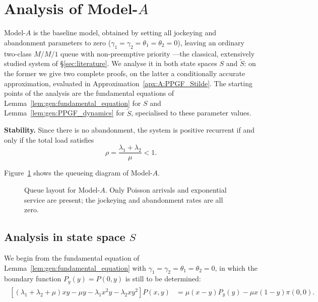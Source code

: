 \section{Analysis of Model-\texorpdfstring{$A$}{A}}\label{sec:model_a}

Model-$A$ is the baseline model, obtained by setting all jockeying and abandonment
parameters to zero ($\gamma_1=\gamma_2=\theta_1=\theta_2=0$), leaving an ordinary
two-class $M/M/1$ queue with non-preemptive priority ---the classical, extensively
studied system of \S\ref{sec:literature}. We analyse it in both state spaces $S$ and
$\widetilde{S}$: on the former we give two complete proofs, on the latter
a conditionally accurate approximation, evaluated in Approximation~\ref{apx:A:PPGF_Stilde}.
The starting points of the analysis are the fundamental equations of
Lemma~\ref{lem:gen:fundamental_equation} for $S$ and Lemma~\ref{lem:gen:PPGF_dynamics}
for $\widetilde{S}$, specialised to these parameter values.

\textbf{Stability.} Since there is no abandonment, the system is positive recurrent if
and only if the total load satisfies
\begin{equation}
    \rho = \frac{\lambda_1+\lambda_2}{\mu} < 1.
    \label{eq:A:stability}
\end{equation}

Figure~\ref{fig:model-a-queue} shows the queueing diagram of Model-$A$.
\begin{figure}[H]
    \centering
    \resizebox{0.62\textwidth}{!}{%
    }
    \caption{Queue layout for Model-$A$. Only Poisson arrivals and exponential service
    are present; the jockeying and abandonment rates are all zero.}
    \label{fig:model-a-queue}
\end{figure}

\subsection{Analysis in state space \texorpdfstring{$S$}{S}}
We begin from the fundamental equation of Lemma~\ref{lem:gen:fundamental_equation} with
$\gamma_1=\gamma_2=\theta_1=\theta_2=0$, in which the boundary function $P_y(y)=P(0,y)$ is
still to be determined:
\begin{align}
    \begin{split}
        \left[ (\lambda_1+\lambda_2+ \mu)xy - \mu y - \lambda_1 x^2 y - \lambda_2 x y^2 \right] P(x,y)
         &= \mu(x-y) P_y(y)
         - \mu x(1-y) \pi(0,0).
    \end{split} \label{eq:A:fundamental}
\end{align}

